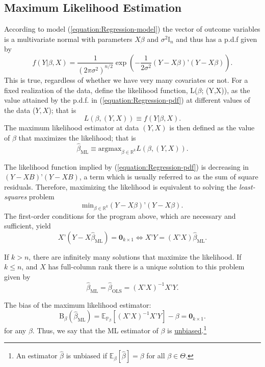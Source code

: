 \documentclass[11pt]{article} %
\begin{document}
\subsection{Maximum Likelihood Estimation}

According to model (\ref{equation:Regression-model}) the vector of outcome variables is a multivariate normal with parameters $X\beta$ and $\sigma^2 \mathbb{I}_n$ and thus has a p.d.f given by
\begin{equation}\label{equation:Regression-pdf}
f( Y | \beta , X ) = \frac{1}{(2 \pi \sigma^2)^{n/2}} \exp \left( -\frac{1}{2 \sigma^2} (Y - X \beta)’ (Y-X\beta) \right).  
\end{equation}
This is true, regardless of whether we have very many covariates or not. For a fixed realization of the data, define the likelihood function, L($\beta$; (Y,X)), as the value attained by the p.d.f. in (\ref{equation:Regression-pdf}) at different values of the data ($Y, X$); that is 
\[ L(\beta, (Y,X)) \equiv f(Y | \beta, X ). \]
The maximum likelihood estimator at data $(Y,X)$ is then defined as the value of $\beta$ that maximizes the likelihood; that is
\[ \widehat{\beta}_{\textrm{ML}} \equiv \textrm{argmax}_{\beta \in \mathbb{R}^{k}} L(\beta, (Y,X)).   \]

\noindent The likelihood function implied by (\ref{equation:Regression-pdf}) is decreasing in $(Y-XB)’(Y-XB)$, a term which is usually referred to as the sum of square residuals. Therefore, maximizing the likelihood is equivalent to solving the \emph{least-squares} problem
\[ \textrm{min}_{\beta \in \mathbb{R}^{k}} (Y-X\beta)’(Y-X\beta).   \]
The first-order conditions for the program above, which are necessary and sufficient, yield
\[ X’(Y-X\widehat{\beta}_{\textrm{ML}}) = \textbf{0}_{k \times 1} \iff X’Y = (X’X) \widehat{\beta}_{\textrm{ML}}. \]

\noindent If $k > n$, there are infinitely many solutions that maximize the likelihood.  If $k \leq n$, and $X$ has full-column rank there is a unique solution to this problem given by
\begin{equation} \label{equation:OLS}
\widehat{\beta}_{\textrm{ML}} = \widehat{\beta}_{\textrm{OLS}} = (X’X)^{-1} X’Y.
\end{equation}

\noindent The bias of the maximum likelihood estimator:
\begin{equation} \label{equation:bias}
\textrm{B}_{\beta}(\widehat{\beta}_{\textrm{ML}}) = \mathbb{E}_{\mathbb{P}_{\beta}} [ (X’X)^{-1} X’Y ] - \beta = \mathbf{0}_{k \times 1}.
\end{equation}
for any $\beta$. Thus, we say that the ML estimator of $\beta$ is \underline{unbiased}.\footnote{An estimator $\widehat{\beta}$ is unbiased if $\mathbb{E}_{\beta} [\widehat{\beta}] = \beta$ for all $\beta \in \Theta$.} 
\end{document}
